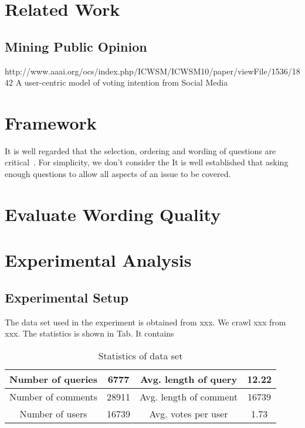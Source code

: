 \documentclass{llncs}
\begin{document}
\section{Related Work}\label{sec:relatedwork}
\subsection{Mining Public Opinion}
http://www.aaai.org/ocs/index.php/ICWSM/ICWSM10/paper/viewFile/1536/1842
A user-centric model of voting intention from Social Media

\subsection{}


\section{Framework}\label{sec:framework}
 It is well regarded that the selection, ordering and wording of questions are critical~\cite{}. For simplicity, we don't consider the 
It is well established that asking enough questions to allow all aspects of an issue to be covered. 


\section{Evaluate Wording Quality}\label{sec:wordingquality}








\section{Experimental Analysis}\label{sec:experiment}
\subsection{Experimental Setup}
The data set used in the experiment is obtained from xxx. We crawl xxx from xxx. The statistics is shown in Tab. It contains 

\begin{table}[htp]
\caption{Statistics of data set}
\begin{center}
\begin{tabular}{|c|c|c|c|}
\hline
Number of queries & 6777 & Avg. length of query & 12.22 \\\hline
Number of comments  & 28911 & Avg. length of comment & 16739\\\hline
Number of users &16739 & Avg. votes per user & 1.73\\\hline
\end{tabular}
\end{center}
\label{tab:data}
\end{table}%
\end{document}
